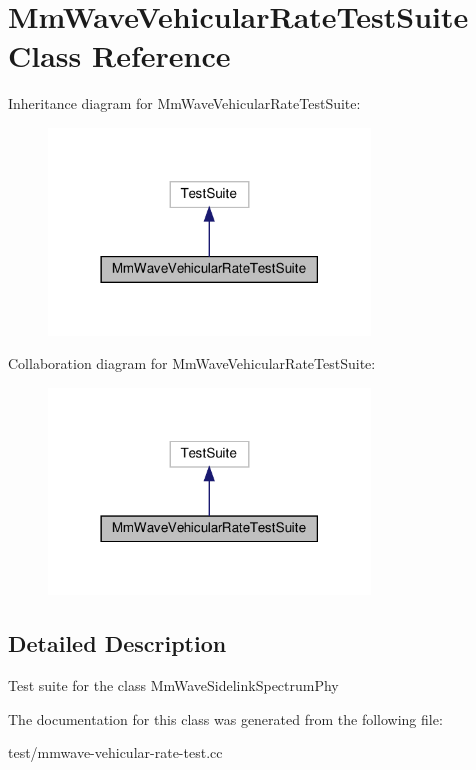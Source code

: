 \hypertarget{classMmWaveVehicularRateTestSuite}{}\section{Mm\+Wave\+Vehicular\+Rate\+Test\+Suite Class Reference}
\label{classMmWaveVehicularRateTestSuite}


Inheritance diagram for Mm\+Wave\+Vehicular\+Rate\+Test\+Suite\+:
\nopagebreak
\begin{figure}[H]
\begin{center}
\leavevmode
\includegraphics[width=242pt]{classMmWaveVehicularRateTestSuite__inherit__graph}
\end{center}
\end{figure}


Collaboration diagram for Mm\+Wave\+Vehicular\+Rate\+Test\+Suite\+:
\nopagebreak
\begin{figure}[H]
\begin{center}
\leavevmode
\includegraphics[width=242pt]{classMmWaveVehicularRateTestSuite__coll__graph}
\end{center}
\end{figure}


\subsection{Detailed Description}
Test suite for the class Mm\+Wave\+Sidelink\+Spectrum\+Phy 

The documentation for this class was generated from the following file\+:\begin{DoxyCompactItemize}
\item 
test/mmwave-\/vehicular-\/rate-\/test.\+cc\end{DoxyCompactItemize}
